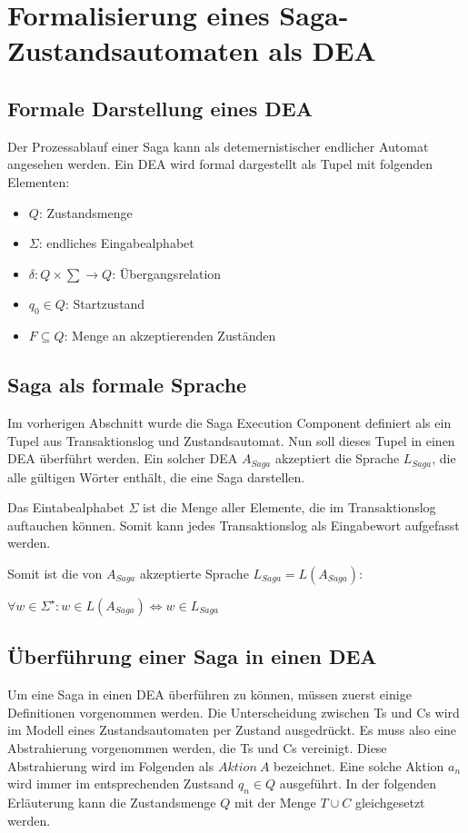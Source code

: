 \section{Formalisierung eines Saga-Zustandsautomaten als DEA} \label{sec_saga_formalisierung_dea}
\subsection{Formale Darstellung eines DEA}
Der Prozessablauf einer Saga kann als detemernistischer endlicher Automat angesehen werden. Ein DEA wird formal dargestellt als Tupel mit folgenden Elementen:
\begin{itemize}
	\item $Q$: Zustandsmenge
	\item $\Sigma$: endliches Eingabealphabet
	\item $\delta: Q \times \sum \rightarrow Q$: Übergangsrelation 
	\item $q_0 \in Q$: Startzustand
	\item $F \subseteq Q$: Menge an akzeptierenden Zuständen
\end{itemize}

\subsection{Saga als formale Sprache}
Im vorherigen Abschnitt wurde die Saga Execution Component definiert als ein Tupel aus Transaktionslog und Zustandsautomat. Nun soll dieses Tupel in einen DEA überführt werden. Ein solcher DEA $A_{Saga}$ akzeptiert die Sprache $L_{Saga}$, die alle gültigen Wörter enthält, die eine Saga darstellen.

Das Eintabealphabet $\Sigma$ ist die Menge aller Elemente, die im Transaktionslog auftauchen können. Somit kann jedes Transaktionslog als Eingabewort aufgefasst werden. 

Somit ist die von $A_{Saga}$ akzeptierte Sprache $L_{Saga} = L(A_{Saga})$: \\

\begin{center}
	$\forall w \in \Sigma^{\star}: w \in L(A_{Saga}) \iff w \in L_{Saga}$
\end{center}

\subsection{Überführung einer Saga in einen DEA}
Um eine Saga in einen DEA überführen zu können, müssen zuerst einige Definitionen vorgenommen werden. Die Unterscheidung zwischen Ts und Cs wird im Modell eines Zustandsautomaten per Zustand ausgedrückt. Es muss also eine Abstrahierung vorgenommen werden, die Ts und Cs vereinigt. Diese Abstrahierung wird im Folgenden als $Aktion\ A$ bezeichnet. Eine solche Aktion $a_n$ wird immer im entsprechenden Zustsand $q_n \in Q$ ausgeführt. In der folgenden Erläuterung kann die Zustandsmenge $Q$ mit der Menge $T \cup C$ gleichgesetzt werden.

